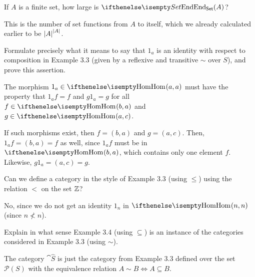 \documentclass[notes,tikz]{agony}
\begin{document}
\begin{xca}
  If $A$ is a finite set, how large is $\End[Set](A)$?
\end{xca}
\begin{sol}
  This is the number of set functions from $A$ to itself,
  which we already calculated earlier to be $\abs{A}^{\abs{A}}$.
\end{sol}

\begin{xca}
  Formulate precisely what it means to say that $1_a$
  is an identity with respect to composition in Example 3.3
  (given by a reflexive and transitive $\sim$ over $S$),
  and prove this assertion.
\end{xca}
\begin{sol}
  The morphism $1_a \in \Hom(a,a)$
  must have the property that $1_af = f$ and $g1_a = g$
  for all $f \in \Hom(b,a)$ and $g \in \Hom(a,c)$.

  If such morphisms exist, then $f = (b,a)$ and $g = (a,c)$.
  Then, $1_a f = (b, a) = f$ as well, since $1_a f$ must be in $\Hom(b,a)$,
  which contains only one element $f$.
  Likewise, $g 1_a = (a, c) = g$.
\end{sol}

\begin{xca}
  Can we define a category in the style of Example 3.3 (using $\leq$)
  using the relation $<$ on the set $\mathbb{Z}$?
\end{xca}
\begin{sol}
  No, since we do not get an identity $1_n$ in $\Hom(n,n)$
  (since $n \not< n$).
\end{sol}

\begin{xca}
  Explain in what sense Example 3.4 (using $\subseteq$)
  is an instance of the categories considered in Example 3.3 (using $\sim$).
\end{xca}
\begin{sol}
  The category $\cat{\hat S}$ is just the category from Example 3.3
  defined over the set $\mathcal{P}(S)$
  with the equivalence relation $A \sim B \iff A \subseteq B$.
\end{sol}
\end{document}
